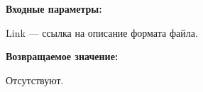 \textbf{Входные параметры:}

Link --- ссылка на описание формата файла.

\textbf{Возвращаемое значение:}

Отсутствуют.